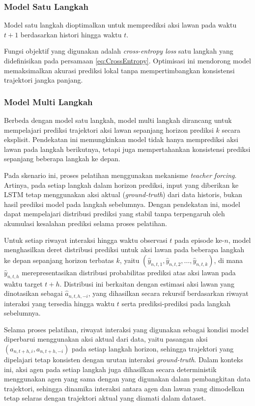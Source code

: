 \subsubsection{Model Satu Langkah}

Model satu langkah dioptimalkan untuk memprediksi aksi lawan pada waktu $t+1$ berdasarkan histori hingga waktu $t$.

Fungsi objektif yang digunakan adalah \textit{cross-entropy loss} satu langkah yang didefinisikan pada persamaan \ref{eq:CrossEntropy}. Optimisasi ini mendorong model memaksimalkan akurasi prediksi lokal tanpa mempertimbangkan konsistensi trajektori jangka panjang.

\subsubsection{Model Multi Langkah}

Berbeda dengan model satu langkah, model multi langkah dirancang untuk mempelajari prediksi trajektori aksi lawan sepanjang horizon prediksi $k$ secara eksplisit. Pendekatan ini memungkinkan model tidak hanya memprediksi aksi lawan pada langkah berikutnya, tetapi juga mempertahankan konsistensi prediksi sepanjang beberapa langkah ke depan.

Pada skenario ini, proses pelatihan menggunakan mekanisme \textit{teacher forcing}. Artinya, pada setiap langkah dalam horizon prediksi, input yang diberikan ke LSTM tetap menggunakan aksi aktual (\textit{ground-truth}) dari data historis, bukan hasil prediksi model pada langkah sebelumnya. Dengan pendekatan ini, model dapat mempelajari distribusi prediksi yang stabil tanpa terpengaruh oleh akumulasi kesalahan prediksi selama proses pelatihan.

Untuk setiap riwayat interaksi hingga waktu observasi $t$ pada episode ke-$n$, model menghasilkan deret distribusi prediksi untuk aksi lawan pada beberapa langkah ke depan sepanjang horizon terbatas $k$, yaitu $(\hat{y}_{n,t,1}, \hat{y}_{n,t,2}, \dots, \hat{y}_{n,t,k})$, di mana $\hat{y}_{n,t,h}$ merepresentasikan distribusi probabilitas prediksi atas aksi lawan pada waktu target $t+h$. Distribusi ini berkaitan dengan estimasi aksi lawan yang dinotasikan sebagai $\hat{a}_{n,t,h,-i}$, yang dihasilkan secara rekursif berdasarkan riwayat interaksi yang tersedia hingga waktu $t$ serta prediksi-prediksi pada langkah sebelumnya.

Selama proses pelatihan, riwayat interaksi yang digunakan sebagai kondisi model diperbarui menggunakan aksi aktual dari data, yaitu pasangan aksi $(a_{n,t+h,i}, a_{n,t+h,-i})$ pada setiap langkah horizon, sehingga trajektori yang dipelajari tetap konsisten dengan urutan interaksi \textit{ground-truth}. Dalam konteks ini, aksi agen pada setiap langkah juga dihasilkan secara deterministik menggunakan agen yang sama dengan yang digunakan dalam pembangkitan data trajektori, sehingga dinamika interaksi antara agen dan lawan yang dimodelkan tetap selaras dengan trajektori aktual yang diamati dalam dataset.

